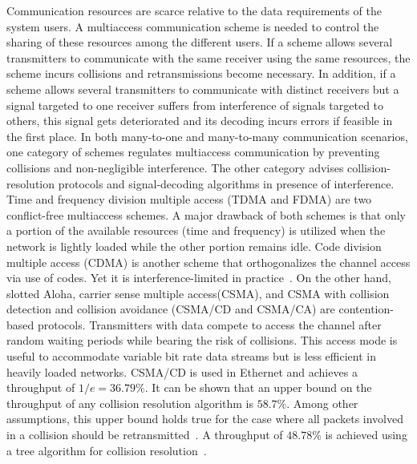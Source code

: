 \documentclass[10pt, a4paper, twocolumn]{IEEEtran}
\begin{document}
Communication resources are scarce relative to the data requirements of the system users. A multiaccess communication scheme is needed to control the sharing of these resources among the different users. If a scheme allows several transmitters to communicate with the same receiver using the same resources, the scheme incurs collisions and retransmissions become necessary. In addition, if a scheme allows several transmitters to communicate with distinct receivers but a signal targeted to one receiver suffers from interference of signals targeted to others, this signal gets deteriorated and its decoding incurs errors if feasible in the first place. In both many-to-one and many-to-many communication scenarios, one category of schemes regulates multiaccess communication by preventing collisions and non-negligible interference. The other category advises collision-resolution protocols and signal-decoding algorithms in presence of interference.\\

\noindent Time and frequency division multiple access (TDMA and FDMA) are two conflict-free multiaccess schemes. A major drawback of both schemes is that only a portion of the available resources (time and frequency) is utilized when the network is lightly loaded while the other portion remains idle. Code division multiple access (CDMA) is another scheme that orthogonalizes the channel access via use of codes. Yet it is interference-limited in practice~\cite{multiaccess}. On the other hand, slotted Aloha, carrier sense multiple access(CSMA), and CSMA with collision detection and collision avoidance (CSMA/CD and CSMA/CA) are contention-based protocols. Transmitters with data compete to access the channel after random waiting periods while bearing the risk of collisions. This access mode is useful to accommodate variable bit rate data streams but is less efficient in heavily loaded networks. CSMA/CD is used in Ethernet and achieves a throughput of $1/e = 36.79\%$. It can be shown that an upper bound on the throughput of any collision resolution algorithm is $58.7\%$. Among other assumptions, this upper bound holds true for the case where all packets involved in a collision should be retransmitted~\cite{data_networks}. A throughput of $48.78\%$ is achieved using a tree algorithm for collision resolution~\cite{data_networks}.\\
\end{document}
